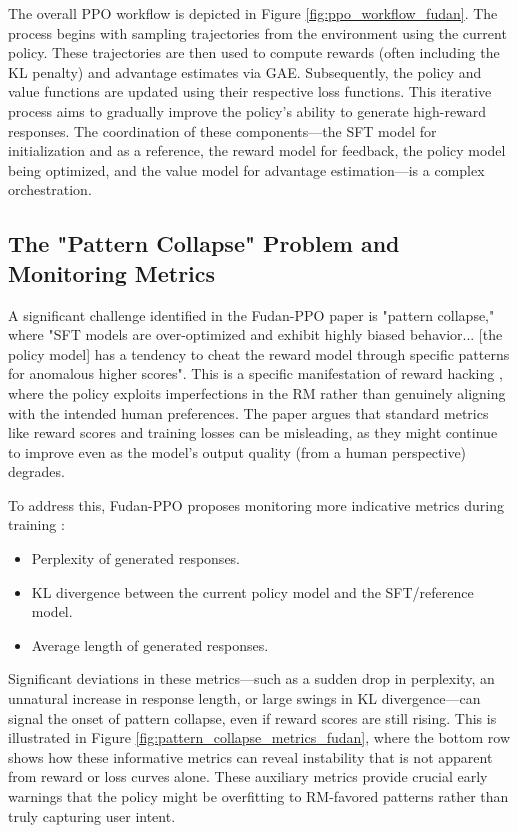 \documentclass{article} %
\begin{document}
The overall PPO workflow is depicted in Figure \ref{fig:ppo_workflow_fudan}. The process begins with sampling trajectories from the environment using the current policy. These trajectories are then used to compute rewards (often including the KL penalty) and advantage estimates via GAE. Subsequently, the policy and value functions are updated using their respective loss functions. This iterative process aims to gradually improve the policy's ability to generate high-reward responses. The coordination of these components—the SFT model for initialization and as a reference, the reward model for feedback, the policy model being optimized, and the value model for advantage estimation—is a complex orchestration.


\subsection{The "Pattern Collapse" Problem and Monitoring Metrics}
A significant challenge identified in the Fudan-PPO paper is "pattern collapse," where "SFT models are over-optimized and exhibit highly biased behavior... [the policy model] has a tendency to cheat the reward model through specific patterns for anomalous higher scores". \cite{Zheng2023PPO} This is a specific manifestation of reward hacking \cite{Zhang2024EnergyLoss, Fu2024RewardShaping, ETHZurichRewardHackingProposal}, where the policy exploits imperfections in the RM rather than genuinely aligning with the intended human preferences. The paper argues that standard metrics like reward scores and training losses can be misleading, as they might continue to improve even as the model's output quality (from a human perspective) degrades. \cite{Zheng2023PPO}

To address this, Fudan-PPO proposes monitoring more indicative metrics during training \cite{Zheng2023PPO}:
\begin{itemize}
    \item Perplexity of generated responses.
    \item KL divergence between the current policy model and the SFT/reference model.
    \item Average length of generated responses.
\end{itemize}
Significant deviations in these metrics—such as a sudden drop in perplexity, an unnatural increase in response length, or large swings in KL divergence—can signal the onset of pattern collapse, even if reward scores are still rising. This is illustrated in Figure \ref{fig:pattern_collapse_metrics_fudan}, where the bottom row shows how these informative metrics can reveal instability that is not apparent from reward or loss curves alone. These auxiliary metrics provide crucial early warnings that the policy might be overfitting to RM-favored patterns rather than truly capturing user intent.
\end{document}
